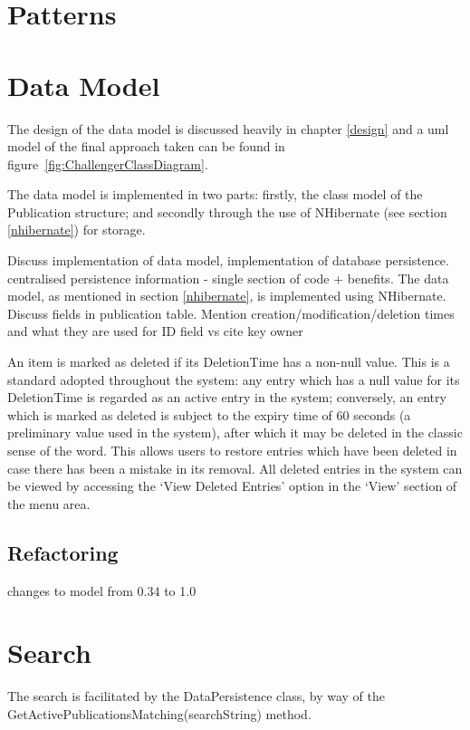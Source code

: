 \section{Patterns}



\section{Data Model}
\label{dataModel}
The design of the data model is discussed heavily in chapter \ref{design} and a \gls{uml} model of the final approach taken can be found in figure~\ref{fig:ChallengerClassDiagram}.

The data model is implemented in two parts: firstly, the class model of the Publication structure; and secondly through the use of NHibernate (see section \ref{nhibernate}) for storage.


Discuss implementation of data model, implementation of database persistence. centralised persistence information - single section of code + benefits.
The data model, as mentioned in section \ref{nhibernate}, is implemented using NHibernate.  
Discuss fields in publication table. Mention creation/modification/deletion times and what they are used for
ID field vs cite key
owner


An item is marked as deleted if its DeletionTime has a non-null value.  This is a standard adopted throughout the system: any entry which has a null value for its DeletionTime is regarded as an active entry in the system; conversely, an entry which is marked as deleted is subject to the expiry time of 60 seconds (a preliminary value used in the system), after which it may be deleted in the classic sense of the word.  This allows users to restore entries which have been deleted in case there has been a mistake in its removal.  All deleted entries  in the system can be viewed by accessing the `View Deleted Entries' option in the `View' section of the menu area.




\subsection{Refactoring}
changes to model from 0.34 to 1.0

\section{Search}
\label{searchCore}
The search is facilitated by the DataPersistence class, by way of the GetActivePublicationsMatching(searchString) method.  

